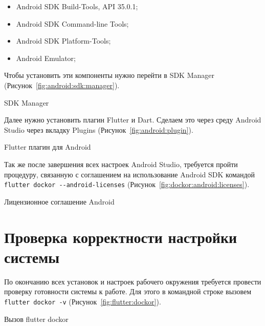 \begin{itemize}
	\item Android SDK Build-Tools, API 35.0.1;
	\item Android SDK Command-line Tools;
	\item Android SDK Platform-Tools;
	\item Android Emulator;
\end{itemize}

Чтобы установить эти компоненты нужно перейти в SDK Manager
(Рисунок~\ref{fig:android:sdk:manager}). 

\begin{image}
	\caption{SDK Manager}
	\label{fig:android:sdk:manager}
\end{image}

Далее нужно установить плагин Flutter и Dart.
Сделаем это через среду Android Studio через вкладку Plugins
(Рисунок~\ref{fig:android:plugin}).

\begin{image}
	\caption{Flutter плагин для Android}
	\label{fig:android:plugin}
\end{image}

Так же после завершения всех настроек Android Studio,
требуется пройти процедуру, связанную с соглашением на использование
Android SDK командой \verb|flutter dockor --android-licenses|
(Рисунок~\ref{fig:dockor:android:licenses}).

\begin{image}
	\caption{Лицензионное соглашение Android}
	\label{fig:dockor:android:licenses}
\end{image}

\section{Проверка корректности настройки системы}

По окончанию всех установок и настроек рабочего окружения требуется
провести проверку готовности системы к работе.
Для этого в командной строке вызовем \texttt{flutter dockor -v}
(Рисунок~\ref{fig:flutter:dockor}).

\begin{image}
	\caption{Вызов flutter dockor}
	\label{fig:flutter:dockor}
\end{image}

